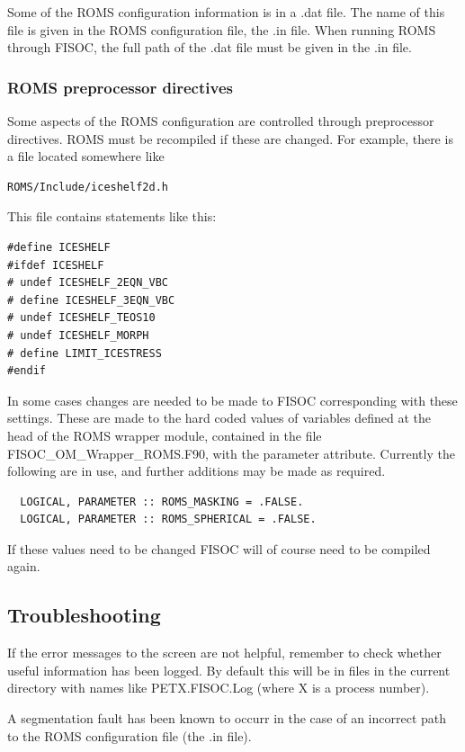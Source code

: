 \documentclass[12pt]{article}
\begin{document}
Some of the ROMS configuration information is in a .dat file.
The name of this file is given in the ROMS configuration file, the .in file.
When running ROMS through FISOC, the full path of the .dat file must be 
given in the .in file.

\subsubsection{ROMS preprocessor directives}
Some aspects of the ROMS configuration are controlled through preprocessor directives.  
ROMS must be recompiled if these are changed.  
For example, there is a file located somewhere like 
\begin{lstlisting}
ROMS/Include/iceshelf2d.h
\end{lstlisting}
This file contains statements like this:
\begin{lstlisting}
#define ICESHELF
#ifdef ICESHELF
# undef ICESHELF_2EQN_VBC
# define ICESHELF_3EQN_VBC
# undef ICESHELF_TEOS10
# undef ICESHELF_MORPH
# define LIMIT_ICESTRESS
#endif
\end{lstlisting}
In some cases changes are needed to be made to FISOC corresponding with these settings. 
These are made to the hard coded values of variables defined at the head of the ROMS 
wrapper module, contained in the file FISOC\_OM\_Wrapper\_ROMS.F90, with the 
parameter  attribute. 
Currently the following are in use, and further additions may be made as required.
\begin{lstlisting}                                                                                           
  LOGICAL, PARAMETER :: ROMS_MASKING = .FALSE.
  LOGICAL, PARAMETER :: ROMS_SPHERICAL = .FALSE.
\end{lstlisting}
If these values need to be changed FISOC will of course need to be compiled again.





\subsection{Troubleshooting}

If the error messages to the screen are not helpful, remember to check whether useful 
information has been logged.  By default this will be in files in the current directory 
with names like PETX.FISOC.Log (where X is a process number).

A segmentation fault has been known to occurr in the case of an incorrect path to the ROMS 
configuration file (the .in file). 
\end{document}
